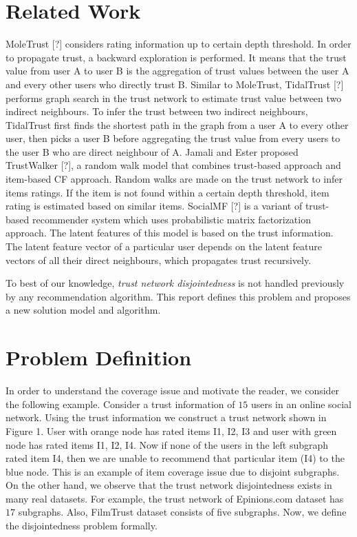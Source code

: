 \documentclass[11pt, conference, onecolumn]{IEEEtran}
\begin{document}
\section{Related Work} \label{sec:related}
MoleTrust [?] considers rating information up to certain depth threshold. In order to propagate trust, a backward exploration is performed. It means that the trust value from user A to user B is the aggregation of trust values between the user A and every other users who directly trust B. Similar to MoleTrust, TidalTrust [?] performs graph search in the trust network to estimate trust value between two indirect neighbours. To infer the trust between two indirect neighbours, TidalTrust first finds the shortest path in the graph from a user A to every other user, then picks a user B before aggregating the trust value from every users to the user B who are direct neighbour of A. Jamali and Ester proposed TrustWalker [?], a random walk model that combines trust-based approach and item-based CF approach. Random walks are made on the trust network to infer items ratings. If the item is not found within a certain depth threshold, item rating is estimated based on similar items. SocialMF [?] is a variant of trust-based recommender system which uses probabilistic matrix factorization approach. The latent features of this model is based on the trust information. The latent feature vector of a particular user depends on the latent feature vectors of all their direct neighbours, which propagates trust recursively.

To best of our knowledge, \textit{trust network disjointedness} is not handled previously by any recommendation algorithm. This report defines this problem and proposes a new solution model and algorithm.

\section{Problem Definition} \label{sec:problem}


In order to understand the coverage issue and motivate the reader, we consider the following example. Consider a trust information of $15$ users in an online social network. Using the trust information we construct a trust network shown in Figure 1. User with orange node has rated items I1, I2, I3 and user with green node has rated items I1, I2, I4. Now if none of the users in the left subgraph rated item I4, then we are unable to recommend that particular item (I4) to the blue node. This is an example of item coverage issue due to disjoint subgraphs. On the other hand, we observe that the trust network disjointedness exists in many real datasets. For example, the trust network of Epinions.com dataset has $17$ subgraphs. Also, FilmTrust dataset consists of five subgraphs. Now, we define the disjointedness problem formally.
\end{document}
